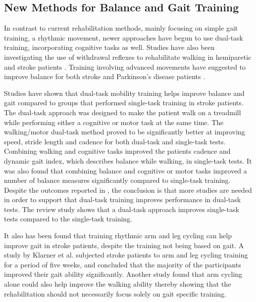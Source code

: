 \subsection{New Methods for Balance and Gait Training}

In contrast to current rehabilitation methods, mainly focusing on simple gait training, a rhythmic movement, newer approaches have begun to use dual-task training, incorporating cognitive tasks as well. Studies have also been investigating the use of withdrawal reflexes to rehabilitate walking in hemiparetic and stroke patients \cite{Emborg2010,Spaich2014}. Training involving advanced movements have suggested to improve balance for both stroke and Parkinson's disease patients \cite{Ding2012,Winser2018}.

Studies have shown that dual-task mobility training helps improve balance and gait compared to groups that performed single-task training in stroke patients. The dual-task approach was designed to make the patient walk on a treadmill while performing either a cognitive or motor task at the same time. \cite{He2018}
The walking/motor dual-task method proved to be significantly better at improving speed, stride length and cadence for both dual-task and single-task tests. Combining walking and cognitive tasks improved the patients cadence and dynamic gait index, which describes balance while walking, in single-task tests. It was also found that combining balance and cognitive or motor tasks improved a number of balance measures significantly compared to single-task training. \cite{He2018}
Despite the outcomes reported in \cite{He2018}, the conclusion is that more studies are needed in order to support that dual-task training improves performance in dual-task tests. The review study shows that a dual-task approach improves single-task tests compared to the single-task training. \cite{He2018}

It also has been found that training rhythmic arm and leg cycling can help improve gait in stroke patients, despite the training not being based on gait. A study by Klarner et al. \cite{Klarner2016} subjected stroke patients to arm and leg cycling training for a period of five weeks, and concluded that the majority of the participants improved their gait ability significantly. Another study found that arm cycling alone could also help improve the walking ability \cite{Kaupp2018} thereby showing that the rehabilitation should not necessarily focus solely on gait specific training.

